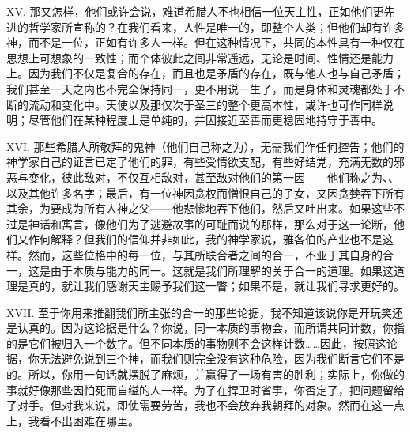 XV. 那又怎样，他们或许会说，难道希腊人不也相信一位天主性，正如他们更先进的哲学家所宣称的？在我们看来，人性是唯一的，即整个人类；但他们却有许多神，而不是一位，正如有许多人一样。但在这种情况下，共同的本性具有一种仅在思想上可想象的一致性；而个体彼此之间非常遥远，无论是时间、性情还是能力上。因为我们不仅是复合的存在，而且也是矛盾的存在，既与他人也与自己矛盾；我们甚至一天之内也不完全保持同一，更不用说一生了，而是身体和灵魂都处于不断的流动和变化中。天使以及那仅次于圣三的整个更高本性，或许也可作同样说明；尽管他们在某种程度上是单纯的，并因接近至善而更稳固地持守于善中。\par

XVI. 那些希腊人所敬拜的鬼神（他们自己称之为），无需我们作任何控告；他们的神学家自己的证言已定了他们的罪，有些受情欲支配，有些好结党，充满无数的邪恶与变化，彼此敌对，不仅互相敌对，甚至敌对他们的第一因——他们称之为、、以及其他许多名字；最后，有一位神因贪权而憎恨自己的子女，又因贪婪吞下所有其余，为要成为所有人神之父——他悲惨地吞下他们，然后又吐出来。如果这些不过是神话和寓言，像他们为了逃避故事的可耻而说的那样，那么对于这一论断，他们又作何解释？但我们的信仰并非如此，我的神学家说，雅各伯的产业也不是这样。然而，这些位格中的每一位，与其所联合者之间的合一，不亚于其自身的合一，这是由于本质与能力的同一。这就是我们所理解的关于合一的道理。如果这道理是真的，就让我们感谢天主赐予我们这一瞥；如果不是，就让我们寻求更好的。\par

XVII. 至于你用来推翻我们所主张的合一的那些论据，我不知道该说你是开玩笑还是认真的。因为这论据是什么？你说，同一本质的事物会，而所谓共同计数，你指的是它们被归入一个数字。但不同本质的事物则不会这样计数……因此，按照这论据，你无法避免说到三个神，而我们则完全没有这种危险，因为我们断言它们不是的。所以，你用一句话就摆脱了麻烦，并赢得了一场有害的胜利；实际上，你做的事就好像那些因怕死而自缢的人一样。为了在捍卫时省事，你否定了，把问题留给了对手。但对我来说，即使需要劳苦，我也不会放弃我朝拜的对象。然而在这一点上，我看不出困难在哪里。\par

